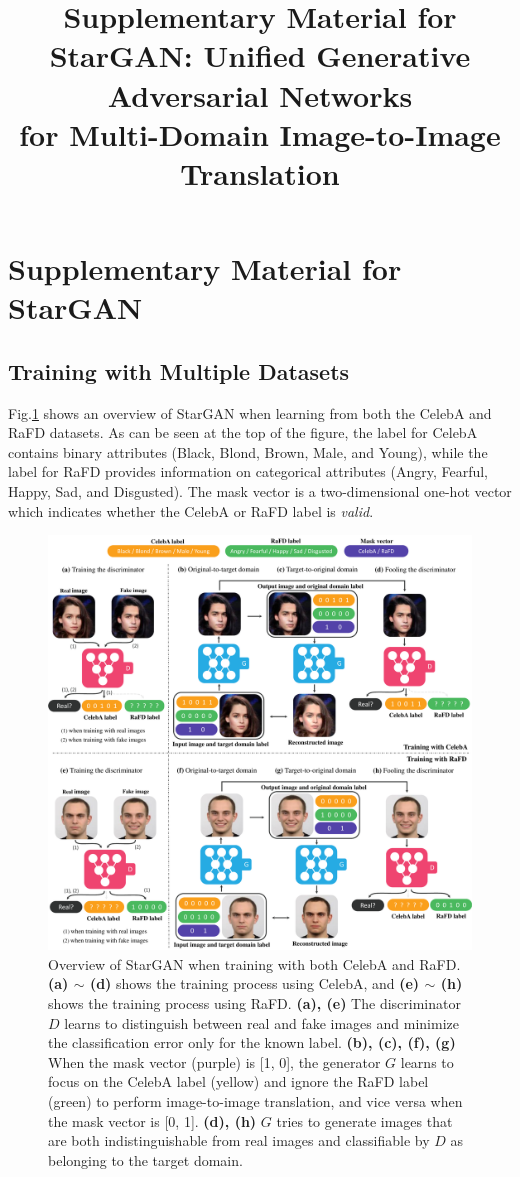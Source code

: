 \documentclass[10pt,twocolumn,letterpaper]{article}
\begin{document}
\title{Supplementary Material for StarGAN: Unified Generative Adversarial Networks \\ for Multi-Domain Image-to-Image Translation}

\onecolumn
\section{Supplementary Material for StarGAN} \label{appendix}
\subsection{Training with Multiple Datasets} 
Fig.\thinspace\ref{figure8} shows an overview of StarGAN when learning from both the CelebA and RaFD datasets. As can be seen at the top of the figure, the label for CelebA contains binary attributes (Black, Blond, Brown, Male, and Young), while the label for RaFD provides information on categorical attributes (Angry, Fearful, Happy, Sad, and Disgusted). The mask vector is a two-dimensional one-hot vector which indicates whether the CelebA or RaFD label is \textit{valid}.


\begin{figure}[h]
\centering
\centerline{\includegraphics[width=0.95\linewidth]{images/supple_model_final.pdf}}
\medskip
\caption{Overview of StarGAN when training with both CelebA and RaFD. \textbf{(a) $\sim$ (d)} shows the training process using CelebA, and \textbf{(e) $\sim$ (h)} shows the training process using RaFD. \textbf{(a), (e)} The discriminator $D$ learns to distinguish between real and fake images and minimize the classification error only for the known label. \textbf{(b), (c), (f), (g)} When the mask vector (purple) is [1, 0], the generator $G$ learns to focus on the CelebA label (yellow) and ignore the RaFD label (green) to perform image-to-image translation, and vice versa when the mask vector is [0, 1]. \textbf{(d), (h)} $G$ tries to generate images that are both indistinguishable from real images and classifiable by $D$ as belonging to the target domain.}
\label{figure8}
\end{figure}
\end{document}
